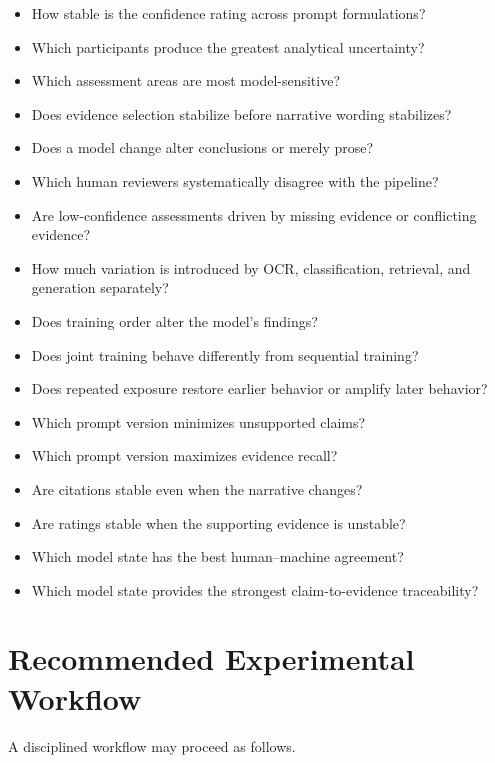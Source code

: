 \documentclass[11pt]{report}
\begin{document}
\begin{itemize}
  \item How stable is the confidence rating across prompt formulations?
  \item Which participants produce the greatest analytical uncertainty?
  \item Which assessment areas are most model-sensitive?
  \item Does evidence selection stabilize before narrative wording stabilizes?
  \item Does a model change alter conclusions or merely prose?
  \item Which human reviewers systematically disagree with the pipeline?
  \item Are low-confidence assessments driven by missing evidence or conflicting evidence?
  \item How much variation is introduced by OCR, classification, retrieval, and generation separately?
  \item Does training order alter the model's findings?
  \item Does joint training behave differently from sequential training?
  \item Does repeated exposure restore earlier behavior or amplify later behavior?
  \item Which prompt version minimizes unsupported claims?
  \item Which prompt version maximizes evidence recall?
  \item Are citations stable even when the narrative changes?
  \item Are ratings stable when the supporting evidence is unstable?
  \item Which model state has the best human--machine agreement?
  \item Which model state provides the strongest claim-to-evidence traceability?
\end{itemize}

\chapter{Recommended Experimental Workflow}

A disciplined workflow may proceed as follows.
\end{document}
